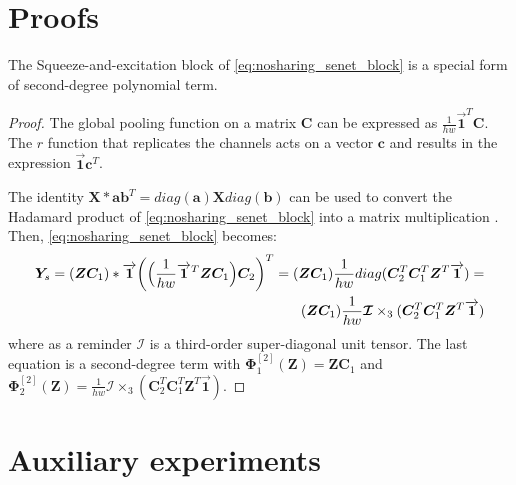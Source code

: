 \documentclass[runningheads]{llncs}
\providecommand{\minvar}{\bm{Z}}
\providecommand{\matr}{\bm{\Phi}}
\providecommand{\matra}[2]{\matr_{#1}^{[#2]}}
\providecommand{\citep}{\cite}
\begin{document}
\section{Proofs}
\begin{claim}
    The Squeeze-and-excitation block of \eqref{eq:nosharing_senet_block} is a special form of second-degree polynomial term. 
\end{claim}

\begin{proof}
    The global pooling function on a matrix $\bm{C}$ can be expressed as $\frac{1}{hw}\overrightarrow{\bm{1}}^T \bm{C}$. The $r$ function that replicates the channels acts on a vector $\bm{c}$ and results in the expression $\overrightarrow{\bm{1}}\bm{c}^T$. 
    
    The identity  $\bm{X} * \bm{a}\bm{b}^T = diag(\bm{a}) \bm{X} diag(\bm{b})$ can be used to convert the Hadamard product of \eqref{eq:nosharing_senet_block} into a matrix multiplication \citep{styan1973hadamard}.  Then, \eqref{eq:nosharing_senet_block} becomes:
    \begin{align}
    \centering
    \begin{split}
        {\bm{Y}}_{s} = (\minvar\bm{C}_1) * \overrightarrow{\bm{1}} \bigg(\Big(\frac{1}{hw}\overrightarrow{\bm{1}}^T\minvar\bm{C}_1\Big)\bm{C}_2\bigg)^T = 
        (\minvar\bm{C}_1) \frac{1}{hw}diag(\bm{C}_2^T\bm{C}_1^T \minvar^T \overrightarrow{\bm{1}}) = \\
        (\minvar\bm{C}_1) \frac{1}{hw} \bm{\mathcal{I}} \times_3 (\bm{C}_2^T\bm{C}_1^T \minvar^T \overrightarrow{\bm{1}})
    \end{split}
    \end{align}
    where as a reminder $\bm{\mathcal{I}}$ is a third-order super-diagonal unit tensor. The last equation is a second-degree term with $\matra{1}{2}(\minvar) = \minvar\bm{C}_1$ and $\matra{2}{2}(\minvar) = \frac{1}{hw} \bm{\mathcal{I}} \times_3 (\bm{C}_2^T\bm{C}_1^T \minvar^T \overrightarrow{\bm{1}})$.
\end{proof}



\section{Auxiliary experiments}
\end{document}
